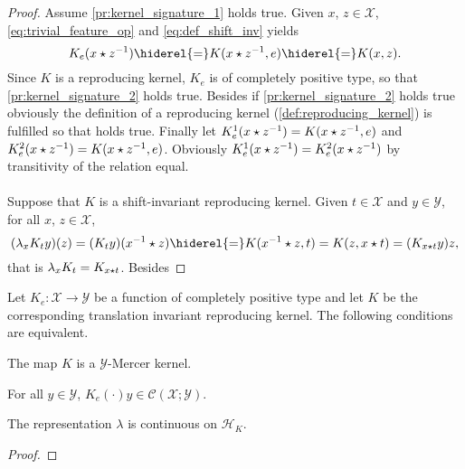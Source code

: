 \begin{proof} Assume \cref{pr:kernel_signature_1} holds true. Given $x$, $z\in\mathcal{X}$, \cref{eq:trivial_feature_op} and \cref{eq:def_shift_inv} yields
\begin{dmath*}
K_e(x\groupop \inv{z})\hiderel{=}K(x\groupop \inv{z},e)\hiderel{=}K(x,z).
\end{dmath*}
Since $K$ is a reproducing kernel, $K_e$ is of completely positive type, so that \cref{pr:kernel_signature_2} holds true. Besides if \cref{pr:kernel_signature_2} holds true obviously the definition of a reproducing kernel (\cref{def:reproducing_kernel}) is fulfilled so that \label{pr:kernel_signature_1} holds true. Finally let $K_e^1(x\star {z}^{-1})=K(x\star {z}^{-1},e)$ and $K_e^2(x\star {z}^{-1})=K(x\star {z}^{-1},e)$.
Obviously $K_e^1(x\star {z}^{-1})=K_e^2(x\star {z}^{-1})$ by transitivity of the relation equal.
\paragraph{}
Suppose that $K$ is a shift-invariant reproducing kernel. Given $t\in\mathcal{X}$ and $y\in\mathcal{Y}$, for all $x$, $z\in\mathcal{X}$,
\begin{dmath*}
(\lambda_xK_ty)(z)=(K_ty)(\inv{x}\groupop z)\hiderel{=}K(\inv{x}\groupop z,t)=K(z,x\groupop t)=(K_{x\groupop t}y)z,
\end{dmath*}
that is $\lambda_xK_t=K_{x\star t}$. Besides
\end{proof}

\begin{lemma}
Let $K_e:\mathcal{X}\to\mathcal{Y}$ be a function of completely positive type and let $K$ be the corresponding translation invariant reproducing kernel. The following conditions are equivalent.
\begin{propenum}
\item The map $K$ is a $\mathcal{Y}$-Mercer kernel.
\item For all $y\in\mathcal{Y}$, $K_e(\cdot)y\in\mathcal{C}(\mathcal{X};\mathcal{Y})$.
\item The representation $\lambda$ is continuous on $\mathcal{H}_K$.
\end{propenum}
\end{lemma}
\begin{proof}

\end{proof}

